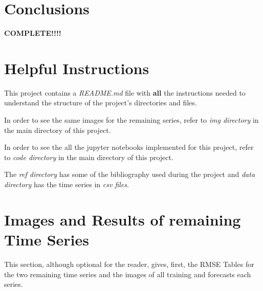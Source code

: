 \documentclass[10pt,twocolumn,letterpaper]{article}
\begin{document}
	
	\section{Conclusions}
	
	\textbf{COMPLETE!!!!}
	
	{\small
		
		
	}
	

	\appendix
	
	
	
	\section{Helpful Instructions }
	
	This project contains a \textit{README.md} file with \textbf{all} the instructions needed to understand the structure of the project's directories and files.
	
	In order to see the same images for the remaining series, refer to \textit{img directory} in the main directory of this project.
	
	In order to see the all the jupyter notebooks implemented for this project, refer to \textit{code directory} in the main directory of this project.
	
	The \textit{ref directory} has some of the bibliography used during the project and \textit{data directory} has the time series in \textit{csv files}.
	
	\section{Images and Results of remaining Time Series}
	
	This section, although optional for the reader, gives, first, the RMSE Tables for the two remaining time series and the images of all training and forecasts each series.
	
\end{document}
